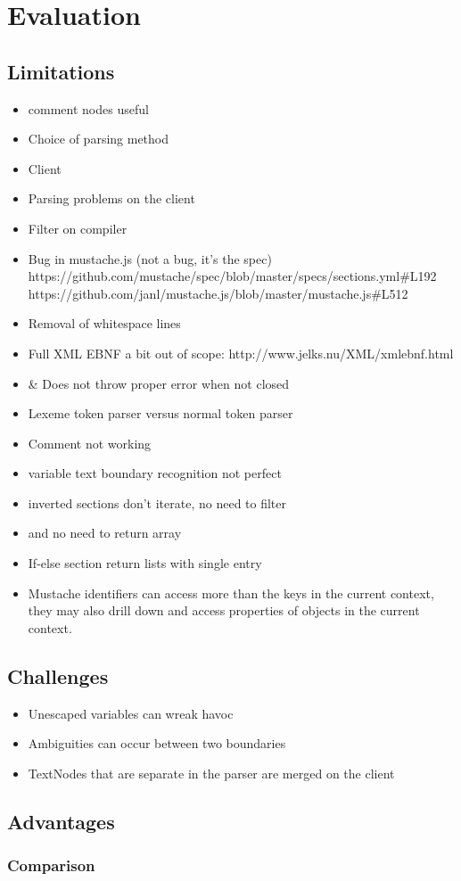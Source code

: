 \chapter{Evaluation}
\label{chap:eval}
\section{Limitations}
\begin{itemize}
\item comment nodes useful
\item Choice of parsing method
\item Client
\item Parsing problems on the client
\item Filter on compiler
\item Bug in mustache.js (not a bug, it's the spec)
      https://github.com/mustache/spec/blob/master/specs/sections.yml\#L192
      https://github.com/janl/mustache.js/blob/master/mustache.js\#L512
\item Removal of whitespace lines
\item Full XML EBNF a bit out of scope: http://www.jelks.nu/XML/xmlebnf.html
\item \& Does not throw proper error when not closed
\item Lexeme token parser versus normal token parser
\item Comment not working
\item variable text boundary recognition not perfect
\item inverted sections don't iterate, no need to filter
\item and no need to return array
\item If-else section return lists with single entry
\item Mustache identifiers can access more than the keys in the current context,
      they may also drill down and access properties of objects in the current
      context.
\end{itemize}

\section{Challenges}
\begin{itemize}
\item Unescaped variables can wreak havoc
\item Ambiguities can occur between two boundaries
\item TextNodes that are separate in the parser are merged on the client
\end{itemize}
\section{Advantages}
\subsection{Comparison}
